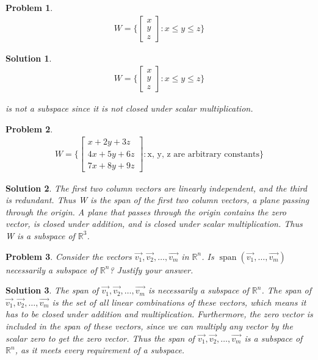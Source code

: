 \documentclass{article}
\newtheorem{problem}{Problem}
\newtheorem*{solution}{Solution}
\DeclareMathOperator{\Span}{span}
\begin{document}
\begin{problem}
\begin{align*}
W = \Bigg \{ \begin{bmatrix} x \\ y \\ z \end{bmatrix} : x \leq y \leq z \Bigg \}
\end{align*}
\end{problem}

\begin{solution}
\begin{align*}
W = \Bigg \{ \begin{bmatrix} x \\ y \\ z \end{bmatrix} : x \leq y \leq z \Bigg \}
\end{align*}

is not a subspace since it is not closed under scalar multiplication.
\end{solution}

\begin{problem}
\begin{align*}
W = \Bigg \{ \begin{bmatrix} x + 2y + 3z \\ 4x + 5y + 6z \\ 7x + 8y + 9z \end{bmatrix} : \textrm{x, y, z are arbitrary constants} \Bigg \}
\end{align*}
\end{problem}

\begin{solution}
The first two column vectors are linearly independent, and the third is redundant. Thus W is the span of the first two column vectors, a plane passing through the origin. A plane that passes through the origin contains the zero vector, is closed under addition, and is closed under scalar multiplication. Thus W is a subspace of $\mathbb{R}^3$.
\end{solution}

\begin{problem}
Consider the vectors $\vec{v_{1}}, \vec{v_{2}}, \dots, \vec{v_{m}}$ in $\mathbb{R}^n$. Is $\Span \left( \vec{v_{1}}, \dots, \vec{v_{m}} \right)$ necessarily a subspace of $\mathbb{R}^n$? Justify your answer.
\end{problem}

\begin{solution}
The span of $\vec{v_{1}}, \vec{v_{2}}, \dots, \vec{v_{m}}$ is necessarily a subspace of $\mathbb{R}^n$. The span of $\vec{v_{1}}, \vec{v_{2}}, \dots, \vec{v_{m}}$ is the set of all linear combinations of these vectors, which means it has to be closed under addition and multiplication. Furthermore, the zero vector is included in the span of these vectors, since we can multiply any vector by the scalar zero to get the zero vector. Thus the span of $\vec{v_{1}}, \vec{v_{2}}, \dots, \vec{v_{m}}$ is a subspace of $\mathbb{R}^n$, as it meets every requirement of a subspace.
\end{solution}
\end{document}
